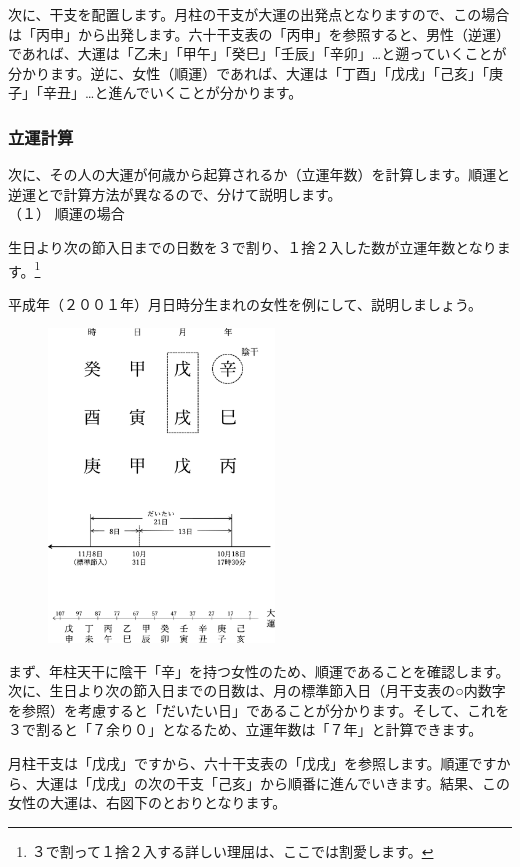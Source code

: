 \documentclass[a5paper,11pt,dvipdfmx]{tarticle}
\begin{document}
次に、干支を配置します。月柱の干支が大運の出発点となりますので、この場合は「丙申」から出発します。六十干支表の「丙申」を参照すると、男性（逆運）であれば、大運は「乙未」「甲午」「癸巳」「壬辰」「辛卯」…と遡っていくことが分かります。逆に、女性（順運）であれば、大運は「丁酉」「戊戌」「己亥」「庚子」「辛丑」…と進んでいくことが分かります。

\subsubsection*{立運計算}
次に、その人の大運が何歳から起算されるか（立運年数）を計算します。順運と逆運とで計算方法が異なるので、分けて説明します。\\

\noindent
（１）	順運の場合

生日より次の節入日までの日数を３で割り、１捨２入した数が立運年数となります。\footnote{３で割って１捨２入する詳しい理屈は、ここでは割愛します。}

平成年（２００１年）月日時分生まれの女性を例にして、説明しましょう。

\begin{figure}[h]
  \includegraphics[width=60mm,angle=90]{figs/figure4-4.eps}
\end{figure}

まず、年柱天干に陰干「辛」を持つ女性のため、順運であることを確認します。次に、生日より次の節入日までの日数は、月の標準節入日（月干支表の○内数字を参照）を考慮すると「だいたい日」であることが分かります。そして、これを３で割ると「７余り０」となるため、立運年数は「７年」と計算できます。

月柱干支は「戊戌」ですから、六十干支表の「戊戌」を参照します。順運ですから、大運は「戊戌」の次の干支「己亥」から順番に進んでいきます。結果、この女性の大運は、右図下のとおりとなります。
\end{document}
